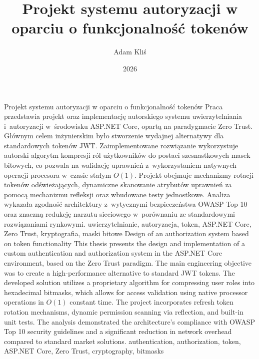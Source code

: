 \documentclass{SGGW-thesis}
\author{Adam Kliś}
\title{Projekt systemu autoryzacji w oparciu o funkcjonalność tokenów}
\date{2026}
\begin{document}
\maketitle
\statementpage
\abstractpage
{Projekt systemu autoryzacji w oparciu o funkcjonalność tokenów}
{Praca przedstawia projekt oraz implementację autorskiego systemu uwierzytelniania i~autoryzacji w~środowisku ASP.NET Core, opartą na paradygmacie Zero Trust. Głównym celem inżynierskim było stworzenie wydajnej alternatywy dla standardowych tokenów JWT. Zaimplementowane rozwiązanie wykorzystuje autorski algorytm kompresji ról użytkowników do postaci szesnastkowych masek bitowych, co pozwala na walidację uprawnień z~wykorzystaniem natywnych operacji procesora w~czasie stałym $O(1)$. Projekt obejmuje mechanizmy rotacji tokenów odświeżających, dynamiczne skanowanie atrybutów uprawnień za pomocą mechanizmu refleksji oraz wbudowane testy jednostkowe. Analiza wykazała zgodność architektury z~wytycznymi bezpieczeństwa OWASP Top 10 oraz znaczną redukcję narzutu sieciowego w~porównaniu ze standardowymi rozwiązaniami rynkowymi.}
{uwierzytelnianie, autoryzacja, token, ASP.NET Core, Zero Trust, kryptografia, maski bitowe}
{Design of an authorization system based on token functionality}
{This thesis presents the design and implementation of a custom authentication and authorization system in the ASP.NET Core environment, based on the Zero Trust paradigm. The main engineering objective was to create a high-performance alternative to standard JWT tokens. The developed solution utilizes a proprietary algorithm for compressing user roles into hexadecimal bitmasks, which allows for access validation using native processor operations in $O(1)$ constant time. The project incorporates refresh token rotation mechanisms, dynamic permission scanning via reflection, and built-in unit tests. The analysis demonstrated the architecture's compliance with OWASP Top 10 security guidelines and a significant reduction in network overhead compared to standard market solutions.}
{authentication, authorization, token, ASP.NET Core, Zero Trust, cryptography, bitmasks}
\end{document}
